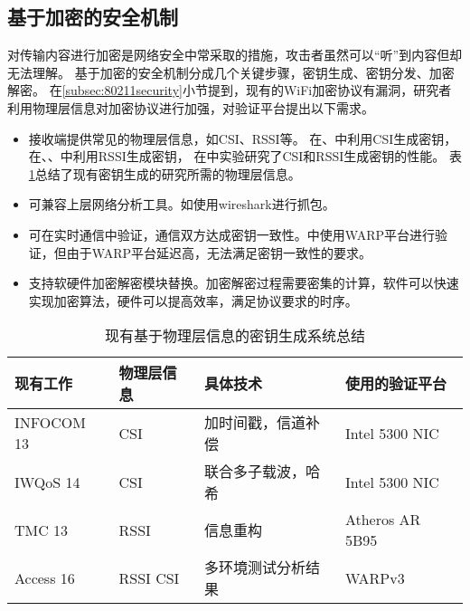 		\subsection{基于加密的安全机制}\label{subsec:demand_encryption}
		对传输内容进行加密是网络安全中常采取的措施，攻击者虽然可以“听”到内容但却无法理解。
		基于加密的安全机制分成几个关键步骤，密钥生成、密钥分发、加密解密。
		在\ref{subsec:80211security}小节提到，现有的WiFi加密协议有漏洞，研究者利用物理层信息对加密协议进行加强，对验证平台提出以下需求。
		\begin{itemize}
			\item 接收端提供常见的物理层信息，如CSI、RSSI等。
			在\cite{infocom13key}、\cite{iwqos14key}中利用CSI生成密钥，
			在\cite{mobicom08key}、\cite{mobicom09key}、\cite{tmc13key}中利用RSSI生成密钥，
			在\cite{access16key}中实验研究了CSI和RSSI生成密钥的性能。
			表\ref{tab:key_generation_summary}总结了现有密钥生成的研究所需的物理层信息。
			\item 可兼容上层网络分析工具。如使用wireshark进行抓包\cite{tmc13key}。
			\item 可在实时通信中验证，通信双方达成密钥一致性。\cite{access16key}中使用WARP平台进行验证，但由于WARP平台延迟高，无法满足密钥一致性的要求。
			\item 支持软硬件加密解密模块替换。加密解密过程需要密集的计算，软件可以快速实现加密算法，硬件可以提高效率，满足协议要求的时序。
		\end{itemize}
		\begin{table}[!hbp]
		\centering
		\caption{现有基于物理层信息的密钥生成系统总结}
		\label{tab:key_generation_summary}
			\begin{tabular}{|l|l|l|l|} \hline
			现有工作 & 物理层信息 & 具体技术 & 使用的验证平台 \\ \hline
			INFOCOM 13\cite{infocom13key} & CSI & 加时间戳，信道补偿 & Intel 5300 NIC \\ \hline
			IWQoS 14\cite{iwqos14key} & CSI & 联合多子载波，哈希 & Intel 5300 NIC \\ \hline
			TMC 13\cite{tmc13key} & RSSI & 信息重构 & Atheros AR 5B95 \\ \hline
			Access 16\cite{access16key} & RSSI CSI & 多环境测试分析结果 & WARPv3 \\ \hline
			\end{tabular}
		\end{table}

